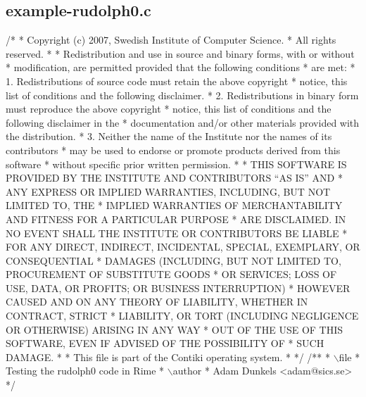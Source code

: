 \hypertarget{a00026}{}\subsection{example-\/rudolph0.\+c}

\begin{DoxyCodeInclude}
\textcolor{comment}{/*}
\textcolor{comment}{ * Copyright (c) 2007, Swedish Institute of Computer Science.}
\textcolor{comment}{ * All rights reserved.}
\textcolor{comment}{ *}
\textcolor{comment}{ * Redistribution and use in source and binary forms, with or without}
\textcolor{comment}{ * modification, are permitted provided that the following conditions}
\textcolor{comment}{ * are met:}
\textcolor{comment}{ * 1. Redistributions of source code must retain the above copyright}
\textcolor{comment}{ *    notice, this list of conditions and the following disclaimer.}
\textcolor{comment}{ * 2. Redistributions in binary form must reproduce the above copyright}
\textcolor{comment}{ *    notice, this list of conditions and the following disclaimer in the}
\textcolor{comment}{ *    documentation and/or other materials provided with the distribution.}
\textcolor{comment}{ * 3. Neither the name of the Institute nor the names of its contributors}
\textcolor{comment}{ *    may be used to endorse or promote products derived from this software}
\textcolor{comment}{ *    without specific prior written permission.}
\textcolor{comment}{ *}
\textcolor{comment}{ * THIS SOFTWARE IS PROVIDED BY THE INSTITUTE AND CONTRIBUTORS ``AS IS'' AND}
\textcolor{comment}{ * ANY EXPRESS OR IMPLIED WARRANTIES, INCLUDING, BUT NOT LIMITED TO, THE}
\textcolor{comment}{ * IMPLIED WARRANTIES OF MERCHANTABILITY AND FITNESS FOR A PARTICULAR PURPOSE}
\textcolor{comment}{ * ARE DISCLAIMED.  IN NO EVENT SHALL THE INSTITUTE OR CONTRIBUTORS BE LIABLE}
\textcolor{comment}{ * FOR ANY DIRECT, INDIRECT, INCIDENTAL, SPECIAL, EXEMPLARY, OR CONSEQUENTIAL}
\textcolor{comment}{ * DAMAGES (INCLUDING, BUT NOT LIMITED TO, PROCUREMENT OF SUBSTITUTE GOODS}
\textcolor{comment}{ * OR SERVICES; LOSS OF USE, DATA, OR PROFITS; OR BUSINESS INTERRUPTION)}
\textcolor{comment}{ * HOWEVER CAUSED AND ON ANY THEORY OF LIABILITY, WHETHER IN CONTRACT, STRICT}
\textcolor{comment}{ * LIABILITY, OR TORT (INCLUDING NEGLIGENCE OR OTHERWISE) ARISING IN ANY WAY}
\textcolor{comment}{ * OUT OF THE USE OF THIS SOFTWARE, EVEN IF ADVISED OF THE POSSIBILITY OF}
\textcolor{comment}{ * SUCH DAMAGE.}
\textcolor{comment}{ *}
\textcolor{comment}{ * This file is part of the Contiki operating system.}
\textcolor{comment}{ *}
\textcolor{comment}{ */}
\textcolor{comment}{}
\textcolor{comment}{/**}
\textcolor{comment}{ * \(\backslash\)file}
\textcolor{comment}{ *         Testing the rudolph0 code in Rime}
\textcolor{comment}{ * \(\backslash\)author}
\textcolor{comment}{ *         Adam Dunkels <adam@sics.se>}
\textcolor{comment}{ */}


\end{DoxyCodeInclude}
